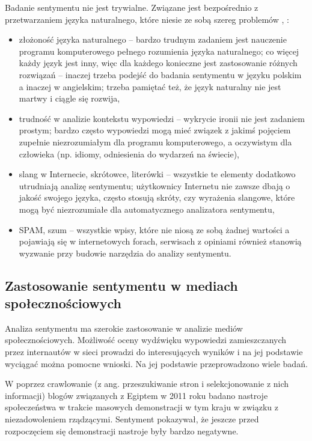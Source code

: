 Badanie sentymentu nie jest trywialne. Związane jest bezpośrednio z 
przetwarzaniem języka naturalnego, które niesie ze sobą szereg problemów
\cite{ChallengeOfSpokenLanguage}, \cite{NaturalLanguageProcessingFuture}:

\begin{itemize}
  \item złożoność języka naturalnego -- bardzo trudnym zadaniem jest nauczenie 
  programu komputerowego pełnego rozumienia języka naturalnego; co więcej każdy
  język jest inny, więc dla każdego konieczne jest zastosowanie różnych
  rozwiązań -- inaczej trzeba podejść do badania sentymentu w języku polskim
  a inaczej w angielskim; trzeba pamiętać też, że język naturalny nie jest
  martwy i ciągle się rozwija,

  \item trudność w analizie kontekstu wypowiedzi -- wykrycie ironii nie jest
  zadaniem prostym; bardzo często wypowiedzi mogą mieć związek z jakimś pojęciem
  zupełnie niezrozumiałym dla programu komputerowego, a oczywistym dla człowieka
  (np. idiomy, odniesienia do wydarzeń na świecie),

  \item slang w Internecie, skrótowce, literówki -- wszystkie te elementy
  dodatkowo utrudniają analizę sentymentu; użytkownicy Internetu nie zawsze
  dbają o jakość swojego języka, często stosują skróty, czy wyrażenia slangowe,
  które mogą być niezrozumiałe dla automatycznego analizatora sentymentu,

  \item SPAM, szum -- wszystkie wpisy, które nie niosą ze sobą żadnej wartości
  a pojawiają się w internetowych forach, serwisach z opiniami również stanowią
  wyzwanie przy budowie narzędzia do analizy sentymentu.

\end{itemize}





\subsection{Zastosowanie sentymentu w mediach społecznościowych}
Analiza sentymentu ma szerokie zastosowanie w analizie mediów społecznościowych.
Możliwość oceny wydźwięku wypowiedzi zamieszczanych przez internautów w sieci
prowadzi do interesujących wyników i na jej podstawie wyciągać można pomocne
wnioski. Na jej podstawie przeprowadzono wiele badań. 

W \cite{AgileSentimentAnalysis}
poprzez crawlowanie (z ang. przeszukiwanie stron i selekcjonowanie z nich
informacji) blogów związanych z Egiptem w 2011 roku badano nastroje
społeczeństwa w trakcie masowych demonstracji w tym kraju w związku z
niezadowoleniem rządzącymi. Sentyment pokazywał, że jeszcze przed rozpoczęciem
się demonstracji nastroje były bardzo negatywne. 

